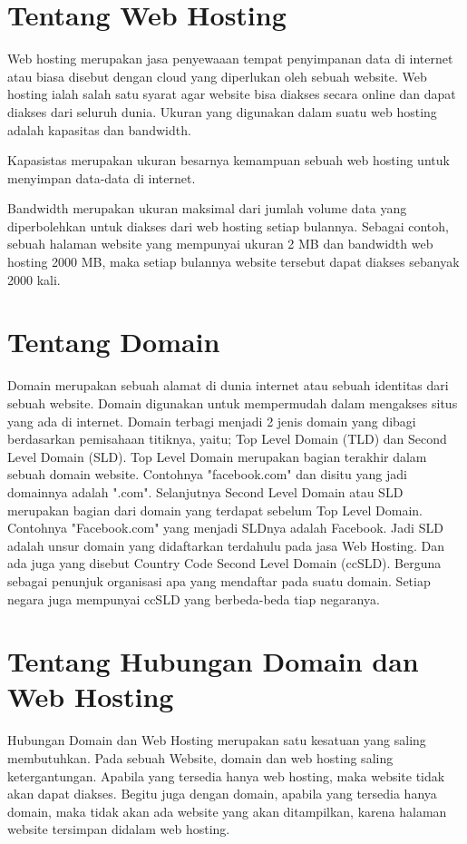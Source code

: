 \documentclass[12pt, a4paper]{article}
\begin{document}
\section{Tentang Web Hosting}
Web hosting merupakan jasa penyewaaan tempat penyimpanan data di internet atau biasa disebut dengan cloud
yang diperlukan oleh sebuah website. Web hosting ialah salah satu syarat agar website bisa diakses secara 
online dan dapat diakses dari seluruh dunia. Ukuran yang digunakan dalam suatu web hosting adalah kapasitas
dan bandwidth. 

Kapasistas merupakan ukuran besarnya kemampuan sebuah web hosting untuk menyimpan data-data di internet.

Bandwidth merupakan ukuran maksimal dari jumlah volume data yang diperbolehkan untuk diakses dari web hosting
setiap bulannya. Sebagai contoh, sebuah halaman website yang mempunyai ukuran 2 MB dan bandwidth web hosting
2000 MB, maka setiap bulannya website tersebut dapat diakses sebanyak 2000 kali.

\section{Tentang Domain}
Domain merupakan sebuah alamat di dunia internet atau sebuah identitas dari sebuah website. Domain digunakan untuk mempermudah dalam mengakses situs yang ada di internet. Domain terbagi menjadi 2 jenis domain yang dibagi berdasarkan pemisahaan titiknya, yaitu; Top Level Domain (TLD) dan Second Level Domain (SLD). Top Level Domain merupakan bagian terakhir dalam sebuah domain website. Contohnya "facebook.com" dan disitu yang jadi domainnya adalah ".com". Selanjutnya Second Level Domain atau SLD merupakan bagian dari domain yang terdapat sebelum Top Level Domain. Contohnya "Facebook.com" yang menjadi SLDnya adalah Facebook. Jadi SLD adalah unsur domain yang didaftarkan terdahulu pada jasa Web Hosting. Dan ada juga yang disebut Country Code Second Level Domain (ccSLD). Berguna sebagai penunjuk organisasi apa yang mendaftar pada suatu domain. Setiap negara juga mempunyai ccSLD yang berbeda-beda tiap negaranya.

\section{Tentang Hubungan Domain dan Web Hosting}
Hubungan Domain dan Web Hosting merupakan satu kesatuan yang saling membutuhkan.
Pada sebuah Website, domain dan web hosting saling ketergantungan. Apabila yang tersedia hanya web hosting, maka website tidak akan dapat diakses. Begitu juga dengan domain, apabila yang tersedia hanya domain, maka tidak akan ada website yang akan ditampilkan, karena halaman website tersimpan didalam web hosting.
\end{document}
